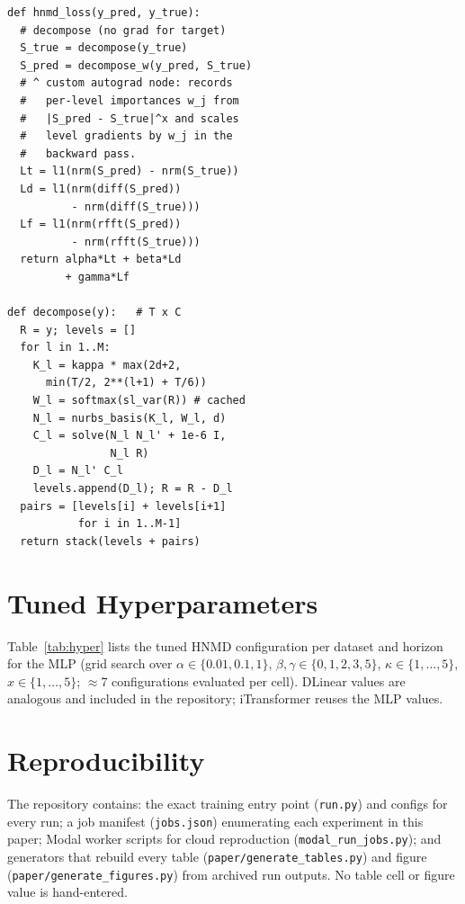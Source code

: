 \documentclass[11pt,twocolumn]{article}
\newcommand{\methodName}{HNMD\xspace}
\begin{document}
\begin{footnotesize}
\begin{verbatim}
def hnmd_loss(y_pred, y_true):
  # decompose (no grad for target)
  S_true = decompose(y_true)
  S_pred = decompose_w(y_pred, S_true)
  # ^ custom autograd node: records
  #   per-level importances w_j from
  #   |S_pred - S_true|^x and scales
  #   level gradients by w_j in the
  #   backward pass.
  Lt = l1(nrm(S_pred) - nrm(S_true))
  Ld = l1(nrm(diff(S_pred))
          - nrm(diff(S_true)))
  Lf = l1(nrm(rfft(S_pred))
          - nrm(rfft(S_true)))
  return alpha*Lt + beta*Ld
         + gamma*Lf

def decompose(y):   # T x C
  R = y; levels = []
  for l in 1..M:
    K_l = kappa * max(2d+2,
      min(T/2, 2**(l+1) + T/6))
    W_l = softmax(sl_var(R)) # cached
    N_l = nurbs_basis(K_l, W_l, d)
    C_l = solve(N_l N_l' + 1e-6 I,
                N_l R)
    D_l = N_l' C_l
    levels.append(D_l); R = R - D_l
  pairs = [levels[i] + levels[i+1]
           for i in 1..M-1]
  return stack(levels + pairs)
\end{verbatim}
\end{footnotesize}

\section{Tuned Hyperparameters}
\label{app:hyper}

Table~\ref{tab:hyper} lists the tuned \methodName configuration per dataset and horizon for the MLP (grid search over $\alpha \in \{0.01, 0.1, 1\}$, $\beta, \gamma \in \{0, 1, 2, 3, 5\}$, $\kappa \in \{1,\dots,5\}$, $x \in \{1,\dots,5\}$; $\approx$7 configurations evaluated per cell). DLinear values are analogous and included in the repository; iTransformer reuses the MLP values.



\section{Reproducibility}
\label{app:repro}

The repository contains: the exact training entry point (\texttt{run.py}) and configs for every run; a job manifest (\texttt{jobs.json}) enumerating each experiment in this paper; Modal worker scripts for cloud reproduction (\texttt{modal\_run\_jobs.py}); and generators that rebuild every table (\texttt{paper/generate\_tables.py}) and figure (\texttt{paper/generate\_figures.py}) from archived run outputs. No table cell or figure value is hand-entered.
\end{document}
